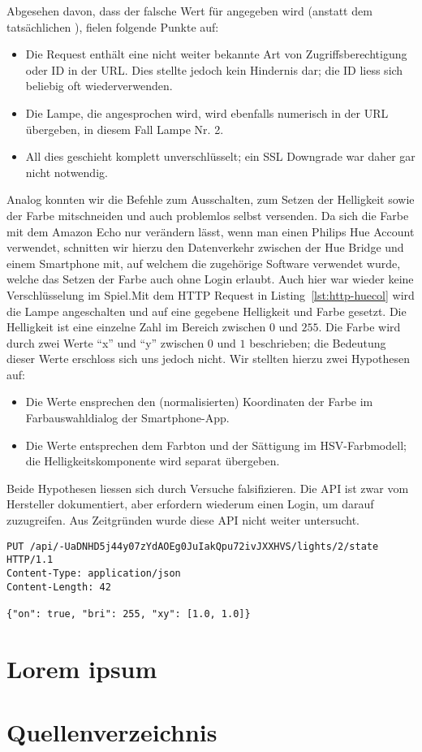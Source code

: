 \documentclass[11pt,a4paper]{scrartcl}
\begin{document}
Abgesehen davon, dass der falsche Wert für  angegeben wird (anstatt dem
tatsächlichen ), fielen folgende Punkte auf:
\begin{itemize}
\item Die Request enthält eine nicht weiter bekannte Art von Zugriffsberechtigung oder ID in
der URL. Dies stellte jedoch kein Hindernis dar; die ID liess sich beliebig oft
wiederverwenden.
\item Die Lampe, die angesprochen wird, wird ebenfalls numerisch in der URL übergeben, in
diesem Fall Lampe Nr. 2.
\item All dies geschieht komplett unverschlüsselt; ein SSL Downgrade war daher gar nicht
notwendig.
\end{itemize}
Analog konnten wir die Befehle zum Ausschalten, zum Setzen der Helligkeit sowie der Farbe
mitschneiden und auch problemlos selbst versenden. Da sich die Farbe mit dem Amazon Echo nur
verändern lässt, wenn man einen Philips Hue Account verwendet, schnitten wir hierzu den
Datenverkehr zwischen der Hue Bridge und einem Smartphone mit, auf welchem die zugehörige
Software verwendet wurde, welche das Setzen der Farbe auch ohne Login erlaubt. Auch hier war
wieder keine Verschlüsselung im Spiel.Mit dem HTTP Request in Listing~\ref{lst:http-huecol}
wird die Lampe angeschalten und auf eine gegebene Helligkeit und Farbe gesetzt. Die
Helligkeit ist eine einzelne Zahl im Bereich zwischen $0$ und $255$. Die Farbe wird durch
zwei Werte ``x'' und ``y'' zwischen $0$ und $1$ beschrieben; die Bedeutung dieser Werte
erschloss sich uns jedoch nicht. Wir stellten hierzu zwei Hypothesen auf:
\begin{itemize}
\item Die Werte ensprechen den (normalisierten) Koordinaten der Farbe im Farbauswahldialog
der Smartphone-App.
\item Die Werte entsprechen dem Farbton und der Sättigung im HSV-Farbmodell; die
Helligkeitskomponente wird separat übergeben.
\end{itemize}
Beide Hypothesen liessen sich durch Versuche falsifizieren. Die API ist zwar vom Hersteller
dokumentiert, aber erfordern wiederum einen Login, um darauf zuzugreifen.
\cite{philips:developer} Aus Zeitgründen wurde diese API nicht weiter untersucht.
\begin{lstlisting}[label={lst:http-huecol},caption={Ein HTTP Request für bunte Lampen.},float,floatplacement=H]
PUT /api/-UaDNHD5j44y07zYdAOEg0JuIakQpu72ivJXXHVS/lights/2/state HTTP/1.1
Content-Type: application/json
Content-Length: 42

{"on": true, "bri": 255, "xy": [1.0, 1.0]}
\end{lstlisting}

\section{Lorem ipsum}
\lipsum
\section{Quellenverzeichnis}
\printbibliography[heading=none]
\end{document}
